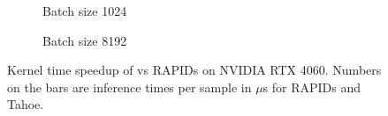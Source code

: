 \begin{figure}[ht]
  \centering
  \begin{subfigure}[b]{.45\textwidth}
    \caption{Batch size 1024}
  \end{subfigure}
  \begin{subfigure}[b]{.45\textwidth}
    \caption{Batch size 8192}
  \end{subfigure}
  \hfill
  \caption{Kernel time speedup of \Treebeard{} vs RAPIDs on NVIDIA RTX 4060. Numbers on the bars are 
  inference times per sample in $\mu$s for RAPIDs and Tahoe.}
\end{figure}

